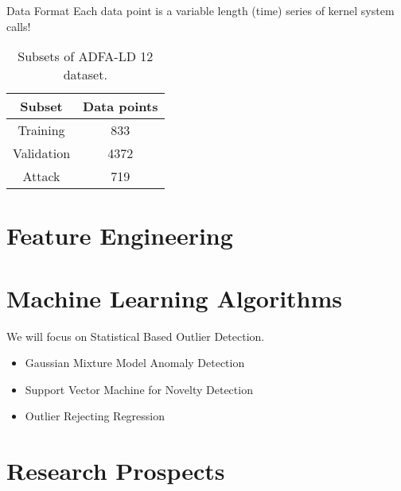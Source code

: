 \documentclass{beamer}
\begin{document}
\begin{frame}{Data Format}
Each data point is a variable length (time) series of kernel system calls!

\begin{table}
\begin{tabular}{|c|c|}
\hline
Subset &  Data points \\ \hline 
Training  & 833 \\ \hline
Validation & 4372 \\ \hline
Attack &  719\\ \hline
\end{tabular}
\vspace{5pt}
\caption{Subsets of ADFA-LD 12 dataset.}
\label{tab3}
\end{table}

\end{frame}




\section{Feature Engineering}



\section{Machine Learning Algorithms}
\frame
{
We will focus on Statistical Based Outlier Detection.
\begin{itemize}
\item Gaussian Mixture Model Anomaly Detection\cite{out2}
\item Support Vector Machine for Novelty Detection\cite{out3}
\item Outlier Rejecting Regression\cite{out6}
\end{itemize}
}

\section{Research Prospects}
\end{document}
